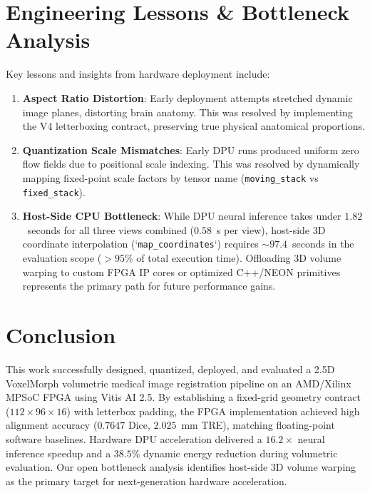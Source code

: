 \documentclass[conference]{IEEEtran}
\begin{document}
\section{Engineering Lessons \& Bottleneck Analysis}
\label{sec:lessons}

Key lessons and insights from hardware deployment include:

\begin{enumerate}
    \item \textbf{Aspect Ratio Distortion}: Early deployment attempts stretched dynamic image planes, distorting brain anatomy. This was resolved by implementing the V4 letterboxing contract, preserving true physical anatomical proportions.
    \item \textbf{Quantization Scale Mismatches}: Early DPU runs produced uniform zero flow fields due to positional scale indexing. This was resolved by dynamically mapping fixed-point scale factors by tensor name (\texttt{moving\_stack} vs \texttt{fixed\_stack}).
    \item \textbf{Host-Side CPU Bottleneck}: While DPU neural inference takes under $1.82$~seconds for all three views combined ($0.58$~s per view), host-side 3D coordinate interpolation (`\texttt{map\_coordinates}`) requires $\sim 97.4$~seconds in the evaluation scope ($>95\%$ of total execution time). Offloading 3D volume warping to custom FPGA IP cores or optimized C++/NEON primitives represents the primary path for future performance gains.
\end{enumerate}

\section{Conclusion}
\label{sec:conclusion}

This work successfully designed, quantized, deployed, and evaluated a 2.5D VoxelMorph volumetric medical image registration pipeline on an AMD/Xilinx MPSoC FPGA using Vitis AI 2.5. By establishing a fixed-grid geometry contract ($112 \times 96 \times 16$) with letterbox padding, the FPGA implementation achieved high alignment accuracy ($0.7647$ Dice, $2.025$~mm TRE), matching floating-point software baselines. Hardware DPU acceleration delivered a $16.2\times$ neural inference speedup and a $38.5\%$ dynamic energy reduction during volumetric evaluation. Our open bottleneck analysis identifies host-side 3D volume warping as the primary target for next-generation hardware acceleration.
\end{document}
